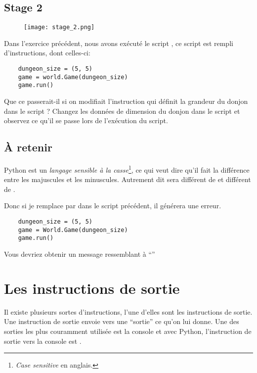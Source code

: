 \subsection{Stage 2}
\begin{figure}[ht]
\texttt{[image: stage\_2.png]} 
\end{figure}

Dans l’exercice précédent, nous avons exécuté le script , ce script est rempli d’instructions, dont celles-ci:

\begin{lstlisting}
    dungeon_size = (5, 5)
    game = world.Game(dungeon_size)
    game.run()
\end{lstlisting}

Que ce passerait-il si on modifiait l’instruction qui définit la grandeur du donjon dans le script ?
Changez les données de dimension du donjon dans le script et observez ce qu'il se passe lors de l'exécution du script.

\subsection{\`{A} retenir}

Python est un \emph{langage sensible à la casse}\footnote{\textit{Case sensitive} en anglais.}, ce qui veut dire qu'il fait la différence entre les majuscules et les minuscules. Autrement dit  sera différent de  et  différent de .

Donc si je remplace  par  dans le script précédent, il générera une erreur.

\begin{lstlisting}
    dungeon_size = (5, 5)
    game = World.Game(dungeon_size)
    game.run()
\end{lstlisting}

Vous devriez obtenir un message ressemblant à ``''

\section{Les instructions de sortie}

Il existe plusieurs sortes d’instructions, l’une d’elles sont les instructions de sortie.
Une instruction de sortie envoie vers une “sortie” ce qu’on lui donne.
Une des sorties les plus couramment utilisée est la console et avec Python, l’instruction de sortie vers la console est .

